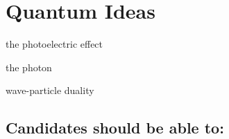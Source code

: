 \documentclass[main.tex]{subfiles}
\begin{document}
\chapter{Quantum Ideas}
\begin{content}
  \item the photoelectric effect
  \item the photon
  \item wave-particle duality
\end{content}
\section*{Candidates should be able to:}
\end{document}
